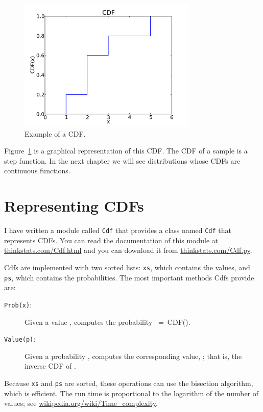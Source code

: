 \documentclass[12pt]{book}
\begin{document}
\begin{figure}
\centerline{\includegraphics[height=2.5in]{figs/example_cdf.pdf}}
\caption{Example of a CDF.}
\label{example_cdf}
\end{figure}

Figure~\ref{example_cdf} is a graphical representation of this CDF.
The CDF of a sample is a step function.  In the next chapter we
will see distributions whose CDFs are continuous functions.  


\section{Representing CDFs}

I have written a module called {\tt Cdf} that provides a class named
{\tt Cdf} that represents CDFs.  You can read the documentation of
this module at \url{thinkstats.com/Cdf.html} and you can download it
from \url{thinkstats.com/Cdf.py}.

Cdfs are implemented with two sorted lists: {\tt xs}, which contains
the values, and {\tt ps}, which contains the probabilities.  The
most important methods Cdfs provide are:

\begin{description}

\item[{\tt Prob(x)}:] Given a value \x, computes the probability \p~=~CDF(\x).

\item[{\tt Value(p)}:] Given a probability \p, computes the
corresponding value, \x; that is, the inverse CDF of \p.

\end{description}

Because {\tt xs} and {\tt ps} are sorted, these operations can use the
bisection algorithm, which is efficient.  The run time is proportional
to the logarithm of the number of values; see
\url{wikipedia.org/wiki/Time_complexity}.
\end{document}
